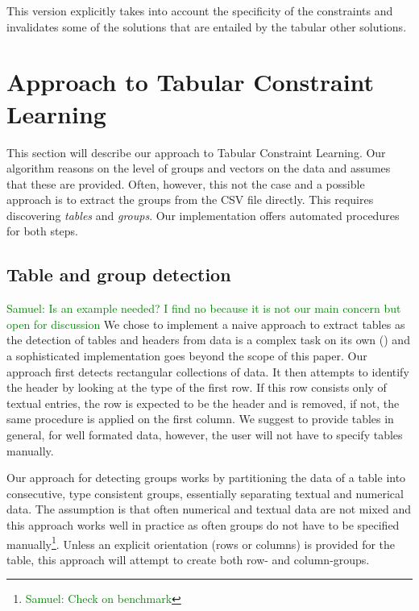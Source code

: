 \documentclass{ecai}
\newcommand{\sergey}[1]{\textcolor{magenta}{{\sc Sergey:} #1}\xspace}
\newcommand{\samuel}[1]{\textcolor{green}{{\sc Samuel:} #1}\xspace}
\begin{document}
This version explicitly takes into account the specificity of the constraints and invalidates some of the solutions that are entailed by the tabular other solutions.

\newcommand{\tcl}{Tabular Constraint Learning}
\newcommand{\ctl}{Condensed Tabular Constraint Learning}
\section{Approach to Tabular Constraint Learning}
This section will describe our approach to \tcl.
Our algorithm reasons on the level of groups and vectors on the data and assumes that these are provided.
Often, however, this not the case and a possible approach is to extract the groups from the CSV file directly.
This requires discovering \textit{tables} and \textit{groups}.
Our implementation offers automated procedures for both steps.

\subsection{Table and group detection}
\samuel{Is an example needed? I find no because it is not our main concern but open for discussion}
We chose to implement a naive approach to extract tables as the detection of tables and headers from data is a complex task on its own (\cite{header}) and a sophisticated implementation goes beyond the scope of this paper.
Our approach first detects rectangular collections of data.
It then attempts to identify the header by looking at the type of the first row.
If this row consists only of textual entries, the row is expected to be the header and is removed, if not, the same procedure is applied on the first column.
We suggest to provide tables in general, for well formated data, however, the user will not have to specify tables manually.

Our approach for detecting groups works by partitioning the data of a table into consecutive, type consistent groups, essentially separating textual and numerical data.
The assumption is that often numerical and textual data are not mixed and this approach works well in practice as often groups do not have to be specified manually\footnote{\samuel{Check on benchmark}}.
Unless an explicit orientation (rows or columns) is provided for the table, this approach will attempt to create both row- and column-groups.
\end{document}
